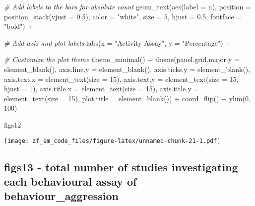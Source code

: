 \documentclass[
]{article}
\newenvironment{Shaded}{\begin{snugshade}}{\end{snugshade}}
\newcommand{\AttributeTok}[1]{\textcolor[rgb]{0.77,0.63,0.00}{#1}}
\newcommand{\CommentTok}[1]{\textcolor[rgb]{0.56,0.35,0.01}{\textit{#1}}}
\newcommand{\DecValTok}[1]{\textcolor[rgb]{0.00,0.00,0.81}{#1}}
\newcommand{\FloatTok}[1]{\textcolor[rgb]{0.00,0.00,0.81}{#1}}
\newcommand{\FunctionTok}[1]{\textcolor[rgb]{0.00,0.00,0.00}{#1}}
\newcommand{\NormalTok}[1]{#1}
\newcommand{\SpecialCharTok}[1]{\textcolor[rgb]{0.00,0.00,0.00}{#1}}
\newcommand{\StringTok}[1]{\textcolor[rgb]{0.31,0.60,0.02}{#1}}
\begin{document}
\begin{Shaded}
\begin{Highlighting}[]
  \CommentTok{\# Add labels to the bars for absolute count  }
  \FunctionTok{geom\_text}\NormalTok{(}\FunctionTok{aes}\NormalTok{(}\AttributeTok{label =}\NormalTok{ n), }\AttributeTok{position =} \FunctionTok{position\_stack}\NormalTok{(}\AttributeTok{vjust =} \FloatTok{0.5}\NormalTok{), }\AttributeTok{color =} \StringTok{"white"}\NormalTok{, }\AttributeTok{size =} \DecValTok{5}\NormalTok{, }\AttributeTok{hjust =} \FloatTok{0.5}\NormalTok{, }\AttributeTok{fontface =}   \StringTok{"bold"}\NormalTok{) }\SpecialCharTok{+}
  
  \CommentTok{\# Add axis and plot labels}
  \FunctionTok{labs}\NormalTok{(}\AttributeTok{x =} \StringTok{"Activity Assay"}\NormalTok{, }\AttributeTok{y =} \StringTok{"Percentage"}\NormalTok{) }\SpecialCharTok{+}
  
  \CommentTok{\# Customize the plot theme}
  \FunctionTok{theme\_minimal}\NormalTok{() }\SpecialCharTok{+}
  \FunctionTok{theme}\NormalTok{(}\AttributeTok{panel.grid.major.y =} \FunctionTok{element\_blank}\NormalTok{(),}
    \AttributeTok{axis.line.y =} \FunctionTok{element\_blank}\NormalTok{(),}
    \AttributeTok{axis.ticks.y =} \FunctionTok{element\_blank}\NormalTok{(),}
    \AttributeTok{axis.text.x =} \FunctionTok{element\_text}\NormalTok{(}\AttributeTok{size =} \DecValTok{15}\NormalTok{),}
    \AttributeTok{axis.text.y =} \FunctionTok{element\_text}\NormalTok{(}\AttributeTok{size =} \DecValTok{15}\NormalTok{, }\AttributeTok{hjust =} \DecValTok{1}\NormalTok{),}
    \AttributeTok{axis.title.x =} \FunctionTok{element\_text}\NormalTok{(}\AttributeTok{size =} \DecValTok{15}\NormalTok{),}
    \AttributeTok{axis.title.y =} \FunctionTok{element\_text}\NormalTok{(}\AttributeTok{size =} \DecValTok{15}\NormalTok{),}
    \AttributeTok{plot.title =} \FunctionTok{element\_blank}\NormalTok{()) }\SpecialCharTok{+}
    \FunctionTok{coord\_flip}\NormalTok{() }\SpecialCharTok{+}
  \FunctionTok{ylim}\NormalTok{(}\DecValTok{0}\NormalTok{, }\DecValTok{100}\NormalTok{)}

\NormalTok{figs12}
\end{Highlighting}
\end{Shaded}

\texttt{[image: zf\_sm\_code\_files/figure-latex/unnamed-chunk-21-1.pdf]}

\hypertarget{figs13---total-number-of-studies-investigating-each-behavioural-assay-of-behaviour_aggression}{%
\subsection{figs13 - total number of studies investigating each
behavioural assay of
behaviour\_aggression}\label{figs13---total-number-of-studies-investigating-each-behavioural-assay-of-behaviour_aggression}}
\end{document}
